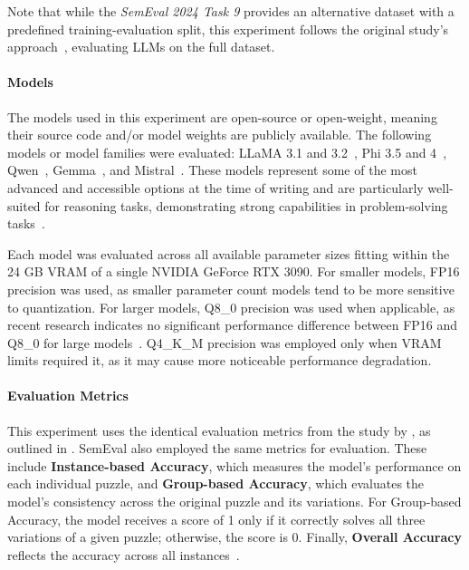 Note that while the \textit{SemEval 2024 Task 9} provides an alternative dataset with a predefined training-evaluation split, this experiment follows the original study's approach~\cite{jiangBRAINTEASERLateralThinking2023}, evaluating \acp{LLM} on the full dataset.

\paragraph{Models}
The models used in this experiment are open-source or open-weight, meaning their source code and/or model weights are publicly available. The following models or model families were evaluated: \ac{LLaMA} 3.1 and 3.2~\cite{grattafioriLlama3Herd2024}, \acs{Phi} 3.5 and 4~\cite{abdinPhi3TechnicalReport2024, abdinPhi4TechnicalReport2024}, \acs{Qwen}~\cite{qwenQwen25TechnicalReport2025}, \acs{Gemma}~\cite{teamGemma2Improving2024}, and \acs{Mistral}~\cite{MistralNeMoMistral}. These models represent some of the most advanced and accessible options at the time of writing and are particularly well-suited for reasoning tasks, demonstrating strong capabilities in problem-solving tasks~\cite{grattafioriLlama3Herd2024, abdinPhi3TechnicalReport2024, abdinPhi4TechnicalReport2024, qwenQwen25TechnicalReport2025, teamGemma2Improving2024, MistralNeMoMistral}.

Each model was evaluated across all available parameter sizes fitting within the 24 GB \ac{VRAM} of a single NVIDIA GeForce RTX 3090. For smaller models, FP16 precision was used, as smaller parameter count models tend to be more sensitive to quantization. For larger models, Q8\_0 precision was used when applicable, as recent research indicates no significant performance difference between FP16 and Q8\_0 for large models~\cite{raubaQuantifyingPerturbationImpacts2024, liEvaluatingQuantizedLarge2024}. Q4\_K\_M precision was employed only when VRAM limits required it, as it may cause more noticeable performance degradation.

\paragraph{Evaluation Metrics}
This experiment uses the identical evaluation metrics from the study by \citeauthor{jiangBRAINTEASERLateralThinking2023}, as outlined in . SemEval also employed the same metrics for evaluation. These include \textbf{Instance-based Accuracy}, which measures the model's performance on each individual puzzle, and \textbf{Group-based Accuracy}, which evaluates the model's consistency across the original puzzle and its variations. For Group-based Accuracy, the model receives a score of 1 only if it correctly solves all three variations of a given puzzle; otherwise, the score is 0. Finally, \textbf{Overall Accuracy} reflects the accuracy across all instances~\cite{jiangBRAINTEASERLateralThinking2023}.

